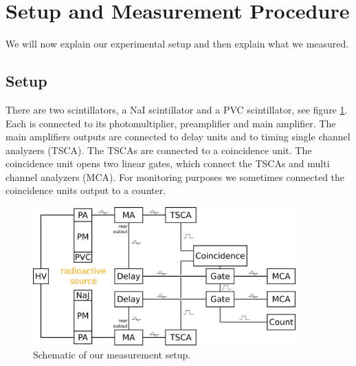 \section{Setup and Measurement Procedure}
 We will now explain our experimental setup and then explain what we
 measured.
\subsection{Setup}


There are two scintillators, a NaI scintillator and a PVC
scintillator, see figure \ref{fig:setup}. Each is connected to its
photomultiplier, preamplifier and main amplifier. 
The main amplifiers outputs are connected to delay units and to timing
single channel analyzers (TSCA). The TSCAs are connected
to a coincidence unit. The coincidence unit opens two linear gates, which
connect the TSCAs and multi channel analyzers (MCA). For monitoring purposes we
sometimes connected the coincidence units output to a counter.

\begin{figure}[tbp]
  \centering
  \includegraphics[width=0.9\textwidth]{setup.png}
  \caption{Schematic of our measurement setup.}
  \label{fig:setup}
\end{figure}



